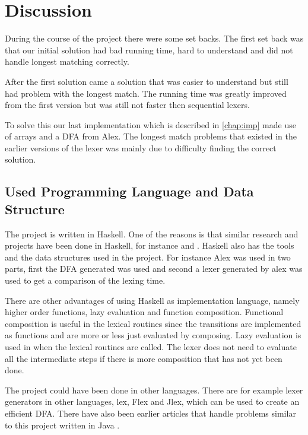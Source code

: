 \chapter{Discussion}
During the course of the project there were some set backs. The first set back
was that our initial solution had bad running time, hard to understand and did
not handle longest matching correctly.

After the first solution came a solution
that was easier to understand but still had problem with the longest match. The
running time was greatly improved from the first version but was still not
faster then sequential lexers.

To solve this our last implementation which is
described in \cref{chap:imp} made use of arrays and a DFA from
Alex. The longest match problems that existed in the earlier versions of the
lexer was mainly due to difficulty finding the correct solution.

\section{Used Programming Language and Data Structure}
The project is written in Haskell. One of the reasons is that similar
research and projects have been done in Haskell, for instance \cite{blog} and \cite{fingertree}.
Haskell also has the tools and the data structures used in the project. For
instance Alex was used in two parts, first the DFA generated was used and second
a lexer generated by alex was used to get a comparison of the lexing time.

There are other advantages of using Haskell as implementation language, namely
higher order functions, lazy evaluation and function composition. Functional
composition is useful in the lexical routines since the transitions are
implemented as functions and are more or less just evaluated by composing.
Lazy evaluation is used in when the lexical routines are called. The lexer does
not need to evaluate all the intermediate steps if there is more composition
that has not yet been done.

The project could have been done in other languages. There are for example
lexer generators in other languages, lex, Flex and Jlex, which can be used to
create an efficient DFA. There have also been earlier articles that handle
problems similar to this project written in Java \cite{JavaIncRegExp}.

